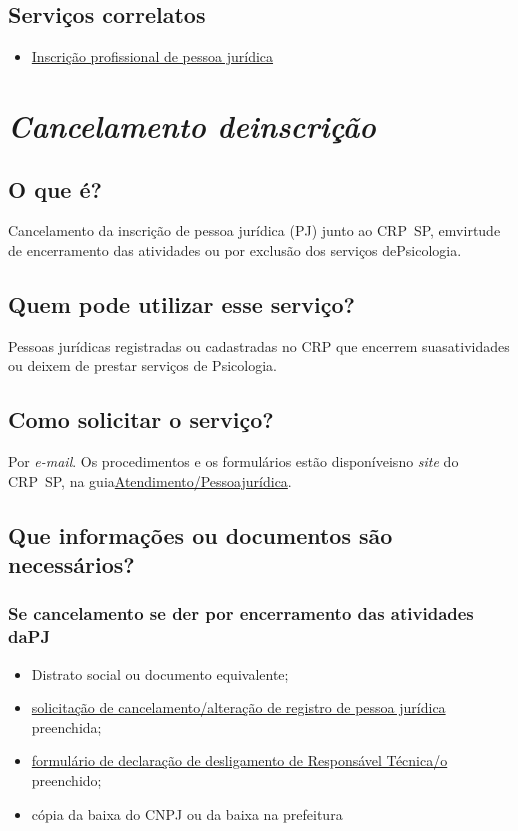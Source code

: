 \section{Serviços correlatos}

\begin{itemize}
  \item  \hyperref[]{Inscrição  profissional de pessoa jurídica}
\end{itemize}

\chapter{\texorpdfstring{\emph{Cancelamento deinscrição}}{Cancelamento de inscrição}}


\section{O que é?}

Cancelamento da inscrição de pessoa jurídica (PJ) junto ao CRP~SP, emvirtude de encerramento das atividades ou por exclusão dos serviços dePsicologia.

\section{Quem pode utilizar esse serviço?}

Pessoas jurídicas registradas ou cadastradas no CRP que encerrem suasatividades ou deixem de prestar serviços de Psicologia.

\section{Como solicitar o serviço?}

Por \emph{e-mail}. Os procedimentos e os formulários estão disponíveisno \emph{site} do CRP~SP, na guia\href{https://www.crpsp.org/pagina/view/30}{Atendimento/Pessoajurídica}.

\section{Que informações ou documentos são necessários?}

\subsection{Se cancelamento se der por encerramento das atividades daPJ}

\begin{itemize}
  \item  Distrato social ou documento equivalente;
  \item  \hyperref[]{solicitação  de cancelamento/alteração de registro de pessoa jurídica} preenchida;
  \item  \hyperref[]{formulário  de declaração de desligamento de Responsável Técnica/o} preenchido;
  \item  cópia da baixa do CNPJ ou da baixa na prefeitura
\end{itemize}

